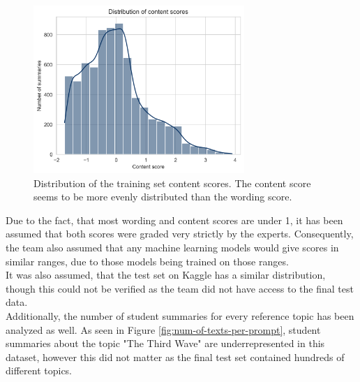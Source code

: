 \begin{figure}[H]
\begin{center}
\includegraphics[width=80mm,scale=0.75]{img/content_score.png}
\end{center}
\caption[Distribution of Content scores]{Distribution of the training set content scores. The content score seems to be more evenly distributed than the wording score.}
\label{fig:content-score}
\end{figure}%

\noindent Due to the fact, that most wording and content scores are under 1, it has been assumed
that both scores were graded very strictly by the experts. Consequently, the team also assumed that any machine learning models would give scores in similar ranges, due to those models being trained on those ranges.\\

\noindent It was also assumed, that the test set on Kaggle has a similar distribution, though this could not be verified as the team did not have access to the final test data.\\

\pagebreak
\noindent Additionally, the number of student summaries for every reference topic has been analyzed as well. As seen in Figure \ref{fig:num-of-texts-per-prompt}, student summaries about the topic "The Third Wave" are underrepresented in this dataset, however this did not matter as the final test set contained hundreds of different topics.\\

